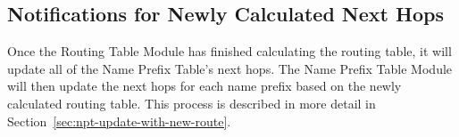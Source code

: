 \subsection{Notifications for Newly Calculated Next Hops}

Once the Routing Table Module has finished calculating the routing table, it will update all of the Name Prefix Table's next hops.
The Name Prefix Table Module will then update the next hops for each name prefix based on the newly calculated routing table.
This process is described in more detail in Section~\ref{sec:npt-update-with-new-route}.
